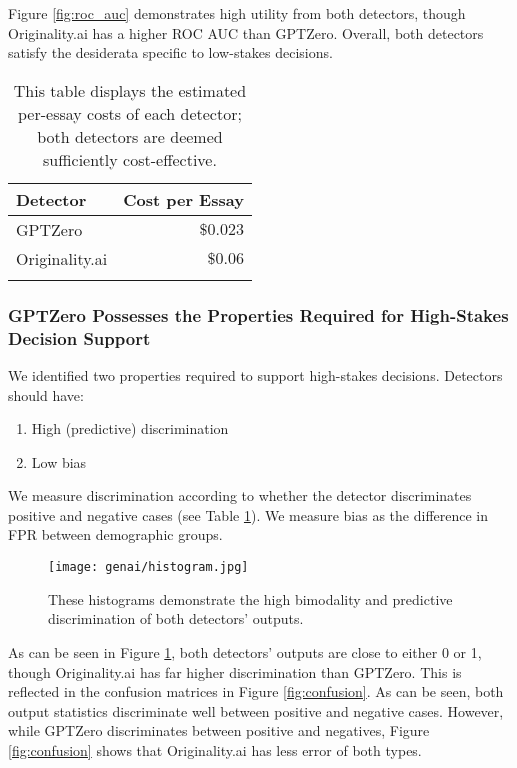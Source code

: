 Figure \ref{fig:roc_auc} demonstrates high utility from both detectors, though Originality.ai has a higher ROC AUC than GPTZero. Overall, both detectors satisfy the desiderata specific to low-stakes decisions.

\begin{table}[htbp]
  \centering
  \caption{This table displays the estimated per-essay costs of each detector; both detectors are deemed sufficiently cost-effective.}
  \label{tab:detector_cost}
  \begin{tabular}{l r}
      \toprule
      Detector & Cost per Essay \\
      \midrule
      GPTZero & $\$0.023$ \\
      Originality.ai & $\$0.06$\\
      \bottomrule\\
  \end{tabular}
\end{table}

\subsubsection{GPTZero Possesses the Properties Required for High-Stakes Decision Support}\label{sssec:highstakes}
We identified two properties required to support high-stakes decisions. Detectors should have:

\begin{enumerate}
    \item High (predictive) discrimination
    \item Low bias
\end{enumerate}

We measure discrimination according to whether the detector discriminates positive and negative cases (see Table \ref{tab:detector_cost}). We measure bias as the difference in FPR between demographic groups.

\begin{figure}[htb]
  \centering
  \texttt{[image: genai/histogram.jpg]}
  \caption{These histograms demonstrate the high bimodality and predictive discrimination of both detectors' outputs.}
  \label{fig:histogram}
\end{figure}

As can be seen in Figure \ref{fig:histogram}, both detectors' outputs are close to either 0 or 1, though Originality.ai has far higher discrimination than GPTZero. This is reflected in the confusion matrices in Figure \ref{fig:confusion}. As can be seen, both output statistics discriminate well between positive and negative cases. However, while GPTZero discriminates between positive and negatives, Figure \ref{fig:confusion} shows that Originality.ai has less error of both types.

